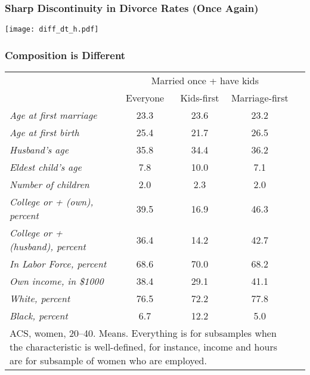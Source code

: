 \documentclass{beamer}
\begin{document}
\begin{frame}[label=disc-sharp]
\frametitle{Sharp Discontinuity in Divorce Rates (Once Again)}
\begin{center}
\texttt{[image: diff\_dt\_h.pdf]}
\end{center}
\hyperlink{disc2}{}
\end{frame}


\begin{frame}
\frametitle{Composition is Different}
\begin{center}\small
\begin{tabular}{ l c c c c }\cline{2-4}
\multicolumn{1}{c}{} &  \multicolumn{3}{c}{Married once + have kids}\\\cline{2-4}
\multicolumn{1}{c}{}  & Everyone & Kids-first & Marriage-first \\\cline{2-4}\hline
\textit{Age at first marriage}         &   23.3        &    23.6        &    23.2 \\
\textit{Age at first birth}         &     25.4     &       21.7       &     26.5 \\
\textit{Husband's age}         &    35.8      &      34.4   &         36.2  \\
\textit{Eldest child's age}         &    7.8    &        10.0     &        7.1 \\
\textit{Number of children}        &      2.0      &       2.3     &       2.0 \\\hline
\textit{College or + (own), percent}    &         39.5     &       16.9     &       46.3 \\
\textit{College or + (husband), percent}      &       36.4     &       14.2       &     42.7 \\\hline
\textit{In Labor Force, percent}     &        68.6    &        70.0        &    68.2 \\
\textit{Own income, in \$1000}  &         38.4 &          29.1 &         41.1 \\
\hline
\textit{White, percent}       &      76.5      &      72.2     &      77.8 \\
\textit{Black, percent}  &        6.7 &            12.2       &       5.0 \\\hline\hline
\multicolumn{4}{p{0.8\linewidth}}{\footnotesize ACS, women, 20--40. Means. Everything is for subsamples when the characteristic is well-defined, for instance, income and hours are for subsample of women who are employed.}\\\hline
\end{tabular}
\end{center}
\end{frame}
\end{document}
